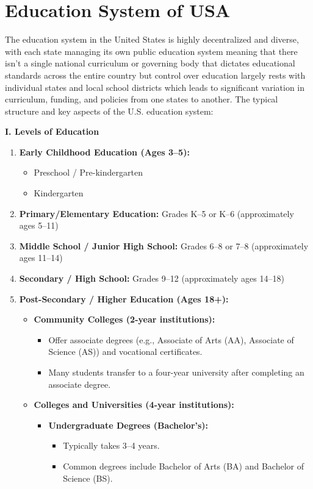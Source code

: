 \section{Education System of USA}
The education system in the United States is highly decentralized and diverse, with each state managing its own public education system meaning that there isn't a single national curriculum or governing body that dictates educational standards across the entire country but control over education largely rests with individual states and local school districts which leads to significant variation in curriculum, funding, and policies from one states to another.
The typical structure and key aspects of the U.S. education system:

\textbf{I. Levels of Education}

\begin{enumerate}
    \item \textbf{Early Childhood Education (Ages 3--5):}
    \begin{itemize}
        \item Preschool / Pre-kindergarten
        \item Kindergarten
    \end{itemize}

    \item \textbf{Primary/Elementary Education:} Grades K--5 or K--6 (approximately ages 5--11)

    \item \textbf{Middle School / Junior High School:} Grades 6--8 or 7--8 (approximately ages 11--14)

    \item \textbf{Secondary / High School:} Grades 9--12 (approximately ages 14--18)

    \item \textbf{Post-Secondary / Higher Education (Ages 18+):}
    \begin{itemize}
        \item \textbf{Community Colleges (2-year institutions):}
        \begin{itemize}
            \item Offer associate degrees (e.g., Associate of Arts (AA), Associate of Science (AS)) and vocational certificates.
            \item Many students transfer to a four-year university after completing an associate degree.
        \end{itemize}

        \item \textbf{Colleges and Universities (4-year institutions):}
        \begin{itemize}
            \item \textbf{Undergraduate Degrees (Bachelor's):}
            \begin{itemize}
                \item Typically takes 3--4 years.
                \item Common degrees include Bachelor of Arts (BA) and Bachelor of Science (BS).
            \end{itemize}


\end{itemize}
\end{itemize}
\end{enumerate}
